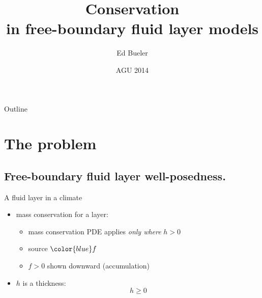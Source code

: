 \documentclass{beamer}
\title[Conservation in free-boundary layers] %
{Conservation \\ in free-boundary fluid layer models}
\author{Ed Bueler}
\institute[UAF] %
{
  Dept of Mathematics and Statistics, and Geophysical Institute\\
  University of Alaska Fairbanks%
}
\date{{\scriptsize AGU 2014}}
\newcommand\bq{\mathbf{q}}
\newcommand{\Div}{\nabla\cdot}
\begin{document}
\graphicspath{{../images/}{../../talks-public/commonfigs/}}

\begin{frame}
  \titlepage
\end{frame}

\begin{frame}{Outline}
  \tableofcontents
\end{frame}





\section{The problem}

\subsection{Free-boundary fluid layer well-posedness.}

\begin{frame}{A fluid layer in a climate}

\begin{center}
\end{center}

\vspace{-9mm}
  \begin{itemize}
  \item mass conservation for a layer:
     \only<1>{$$h_t + \Div\bq = f$$}
     \only<2->{$$h_t + \Div\bq = {\color{blue} f}$$}
    \begin{itemize}
    \vspace{-4mm}
    \item<1->[$\circ$] mass conservation PDE applies \emph{only where} $h>0$
    \item<2->[$\circ$] source ${\color{blue} f}$
    \item<2->[$\circ$] $f>0$ shown downward (accumulation)
    \end{itemize}
  \item<3> $h$ is a thickness:
      $$h\ge 0$$
  \end{itemize}
\end{frame}
\end{document}
